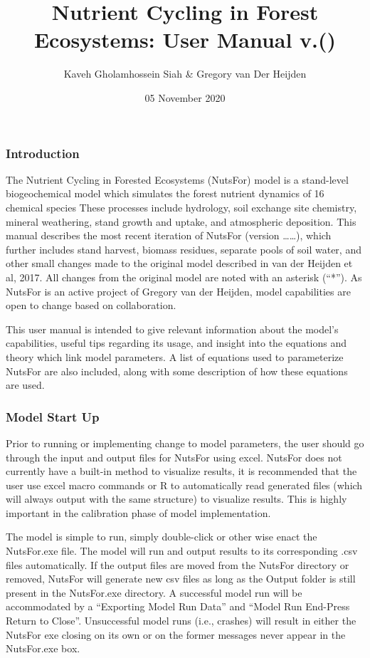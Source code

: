 \documentclass[
]{article}
\title{Nutrient Cycling in Forest Ecosystems: User Manual v.()}
\author{Kaveh Gholamhossein Siah \& Gregory van Der Heijden}
\date{05 November 2020}
\begin{document}
\maketitle

{
\setcounter{tocdepth}{3}
\tableofcontents
}
\hypertarget{introduction}{%
\subsubsection{Introduction}\label{introduction}}

The Nutrient Cycling in Forested Ecosystems (NutsFor) model is a
stand-level biogeochemical model which simulates the forest nutrient
dynamics of 16 chemical species These processes include hydrology, soil
exchange site chemistry, mineral weathering, stand growth and uptake,
and atmospheric deposition. This manual describes the most recent
iteration of NutsFor (version \ldots\ldots), which further includes
stand harvest, biomass residues, separate pools of soil water, and other
small changes made to the original model described in van der Heijden et
al, 2017. All changes from the original model are noted with an asterisk
(``*''). As NutsFor is an active project of Gregory van der Heijden,
model capabilities are open to change based on collaboration.

This user manual is intended to give relevant information about the
model's capabilities, useful tips regarding its usage, and insight into
the equations and theory which link model parameters. A list of
equations used to parameterize NutsFor are also included, along with
some description of how these equations are used.

\hypertarget{model-start-up}{%
\subsubsection{Model Start Up}\label{model-start-up}}

Prior to running or implementing change to model parameters, the user
should go through the input and output files for NutsFor using excel.
NutsFor does not currently have a built-in method to visualize results,
it is recommended that the user use excel macro commands or R to
automatically read generated files (which will always output with the
same structure) to visualize results. This is highly important in the
calibration phase of model implementation.

The model is simple to run, simply double-click or other wise enact the
NutsFor.exe file. The model will run and output results to its
corresponding .csv files automatically. If the output files are moved
from the NutsFor directory or removed, NutsFor will generate new csv
files as long as the Output folder is still present in the NutsFor.exe
directory. A successful model run will be accommodated by a ``Exporting
Model Run Data'' and ``Model Run End-Press Return to Close''.
Unsuccessful model runs (i.e., crashes) will result in either the
NutsFor exe closing on its own or on the former messages never appear in
the NutsFor.exe box.
\end{document}
